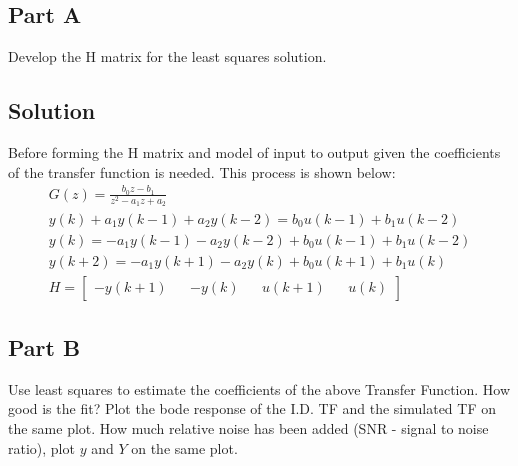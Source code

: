 \documentclass{article}
\begin{document}
\subsection*{Part A}
Develop the H matrix for the least squares solution.
\subsection*{Solution}
Before forming the H matrix and model of input to output given the coefficients of the transfer function is needed. This process is shown below:
\begin{gather*}
    G(z) = \frac{b_0 z - b_1}{z^2 - a_1z + a_2} \\
    y(k) + a_1 y(k-1) + a_2 y(k-2) = b_0 u(k-1) + b_1 u(k-2) \\
    y(k) = -a_1 y(k-1) - a_2 y(k-2) + b_0 u(k-1) + b_1 u(k-2) \\
    y(k+2) = -a_1 y(k+1) - a_2 y(k) + b_0 u(k+1) + b_1 u(k) \\
    H = \begin{bmatrix} -y(k+1) && -y(k) && u(k+1) && u(k) \end{bmatrix}
\end{gather*}

\subsection*{Part B}
Use least squares to estimate the coefficients of the above Transfer Function.  How good is the fit? Plot the bode response of the I.D. TF 
and the simulated TF on the same plot.  How much relative noise has been added (SNR - signal to noise ratio), plot $y$ and $Y$ on the same plot.
\end{document}
